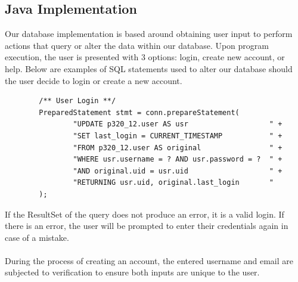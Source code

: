 \documentclass[12pt]{article}
\begin{document}
    \subsection{Java Implementation}
    Our database implementation is based around obtaining user input to
    perform actions that query or alter the data within our database. Upon program
    execution, the user is presented with 3 options: login, create new account, or help.
    Below are examples of SQL statements used to alter our database should the user
    decide to login or create a new account.
    \begin{lstlisting}
        /** User Login **/
        PreparedStatement stmt = conn.prepareStatement(
                "UPDATE p320_12.user AS usr                   " +
                "SET last_login = CURRENT_TIMESTAMP           " +
                "FROM p320_12.user AS original                " +
                "WHERE usr.username = ? AND usr.password = ?  " +
                "AND original.uid = usr.uid                   " +
                "RETURNING usr.uid, original.last_login       "
        );
    \end{lstlisting}
    If the ResultSet of the query does not produce an error, it is a valid login.
    If there is an error, the user will be prompted to enter their credentials again
    in case of a mistake.
    \\~\\
    During the process of creating an account, the entered username and email are
    subjected to verification to ensure both inputs are unique to the user.
\end{document}

